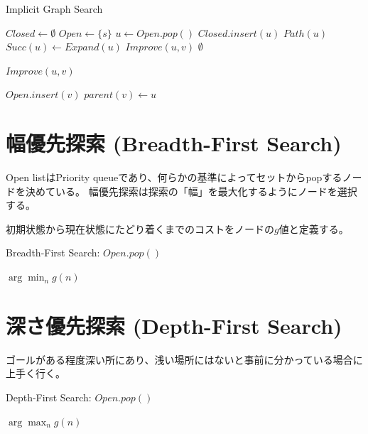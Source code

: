 \documentclass{report}
\begin{document}
\begin{algorithm}
\caption{Implicit Graph Search}
\label{alg:implicit-graph-search}
	$Closed \leftarrow \emptyset$\;
	$Open \leftarrow \{s\}$\;
	 {
		$u \leftarrow Open.pop()$\;
		$Closed.insert(u)$\;
		 {
			\Return $Path(u)$\;
		}
		$Succ(u) \leftarrow Expand(u)$\;
		 {
			$Improve(u, v)$\;
		}
 	}
	\Return $\emptyset$\;
\end{algorithm}

\begin{algorithm}
\caption{$Improve(u,v)$}
\label{alg:improve}
	 {
		$Open.insert(v)$\;
		$parent(v) \leftarrow u$\;
	}
\end{algorithm}

\section{幅優先探索 (Breadth-First Search)}
\label{sec:breadth-first-search}

Open listはPriority queueであり、何らかの基準によってセットからpopするノードを決めている。
幅優先探索は探索の「幅」を最大化するようにノードを選択する。

初期状態から現在状態にたどり着くまでのコストをノードの$g$値と定義する。

\begin{algorithm}
\caption{Breadth-First Search: $Open.pop()$}
\label{alg:brfs-open}
	\Return $\arg \min_n g(n)$
\end{algorithm}

\section{深さ優先探索 (Depth-First Search)}
\label{sec:depth-first-search}

ゴールがある程度深い所にあり、浅い場所にはないと事前に分かっている場合に上手く行く。


\begin{algorithm}
\caption{Depth-First Search: $Open.pop()$}
\label{alg:dfs-open}
	\Return $\arg \max_n g(n)$
\end{algorithm}
\end{document}
